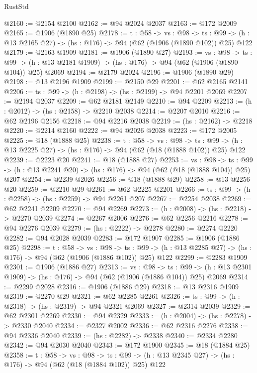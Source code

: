 \begin{lexlean}{RustStd}
\begin{coremodule}
@2160 := @2154 @2100
@2162 := @94 @2024 @2037
@2163 := @172 @2009
@2165 := @1906 (@1890 @25)
@2178 := {t : @58} ->
  {vs : @98} ->
  {ts : @99} -> (h : @13 @2165 @27) -> (hs : @176) -> @94 (@62 (@1906 (@1890 @102)) @25) @122
@2179 := @2163 @1909
@2181 := @1906 (@1890 @27)
@2193 := {vs : @98} ->
  {ts : @99} -> (h : @13 @2181 @1909) -> (hs : @176) -> @94 (@62 (@1906 (@1890 @104)) @25) @2069
@2194 := @2179 @2024
@2196 := @1906 (@1890 @29)
@2198 := @13 @2196 @1909
@2199 := @2150 @29
@2201 := @62 @2165 @2141
@2206 := {ts : @99} -> (h : @2198) -> (hs : @2199) -> @94 @2201 @2069
@2207 := @2194 @2037
@2209 := @62 @2181 @2149
@2210 := @94 @2209
@2213 := (h : @2012) -> (hs : @2158) -> @2210 @2038
@2214 := @2207 @2010
@2216 := @62 @2196 @2156
@2218 := @94 @2216 @2038
@2219 := (hs : @2162) -> @2218
@2220 := @2214 @2160
@2222 := @94 @2026 @2038
@2223 := @172 @2005
@2225 := @18 (@1888 @25)
@2238 := {t : @58} ->
  {vs : @98} ->
  {ts : @99} -> (h : @13 @2225 @27) -> (hs : @176) -> @94 (@62 (@18 (@1888 @102)) @25) @122
@2239 := @2223 @20
@2241 := @18 (@1888 @27)
@2253 := {vs : @98} ->
  {ts : @99} -> (h : @13 @2241 @20) -> (hs : @176) -> @94 (@62 (@18 (@1888 @104)) @25) @207
@2254 := @2239 @2026
@2256 := @18 (@1888 @29)
@2258 := @13 @2256 @20
@2259 := @2210 @29
@2261 := @62 @2225 @2201
@2266 := {ts : @99} -> (h : @2258) -> (hs : @2259) -> @94 @2261 @207
@2267 := @2254 @2038
@2269 := @62 @2241 @2209
@2270 := @94 @2269
@2273 := (h : @2008) -> (hs : @2218) -> @2270 @2039
@2274 := @2267 @2006
@2276 := @62 @2256 @2216
@2278 := @94 @2276 @2039
@2279 := (hs : @2222) -> @2278
@2280 := @2274 @2220
@2282 := @94 @2028 @2039
@2283 := @172 @1907
@2285 := @1906 (@1886 @25)
@2298 := {t : @58} ->
  {vs : @98} ->
  {ts : @99} -> (h : @13 @2285 @27) -> (hs : @176) -> @94 (@62 (@1906 (@1886 @102)) @25) @122
@2299 := @2283 @1909
@2301 := @1906 (@1886 @27)
@2313 := {vs : @98} ->
  {ts : @99} -> (h : @13 @2301 @1909) -> (hs : @176) -> @94 (@62 (@1906 (@1886 @104)) @25) @2069
@2314 := @2299 @2028
@2316 := @1906 (@1886 @29)
@2318 := @13 @2316 @1909
@2319 := @2270 @29
@2321 := @62 @2285 @2261
@2326 := {ts : @99} -> (h : @2318) -> (hs : @2319) -> @94 @2321 @2069
@2327 := @2314 @2039
@2329 := @62 @2301 @2269
@2330 := @94 @2329
@2333 := (h : @2004) -> (hs : @2278) -> @2330 @2040
@2334 := @2327 @2002
@2336 := @62 @2316 @2276
@2338 := @94 @2336 @2040
@2339 := (hs : @2282) -> @2338
@2340 := @2334 @2280
@2342 := @94 @2030 @2040
@2343 := @172 @1900
@2345 := @18 (@1884 @25)
@2358 := {t : @58} ->
  {vs : @98} ->
  {ts : @99} -> (h : @13 @2345 @27) -> (hs : @176) -> @94 (@62 (@18 (@1884 @102)) @25) @122

\end{coremodule}
\end{lexlean}
